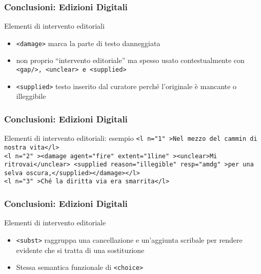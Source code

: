 \begin{frame}
    \frametitle{Conclusioni: Edizioni Digitali}
    \addtocounter{nframe}{1}
    

    \begin{block}{Elementi di intervento editoriali}
        \begin{itemize}
            \item \texttt{<damage>} marca la parte di testo danneggiata
            \item[] non proprio “intervento editoriale” ma spesso usato contestualmente con \texttt{<gap/>,  <unclear> e <supplied>}
            \item \texttt{<supplied>} testo inserito dal curatore perché l’originale è mancante o illeggibile
        \end{itemize} 
    \end{block}
\end{frame}

\begin{frame}
    \frametitle{Conclusioni: Edizioni Digitali}
    \addtocounter{nframe}{1}
    

    \begin{block}{Elementi di intervento editoriali: esempio}
        \texttt{<l n="1" >Nel mezzo del cammin di nostra vita</l>}
        \\\texttt{<l n="2" ><damage agent="fire" extent="1line" ><unclear>Mi ritrovai</unclear> <supplied reason="illegible" resp="amdg" >per una selva oscura,</supplied></damage></l>}
        \\\texttt{<l n="3" >Ché la diritta via era smarrita</l>}
    \end{block}
\end{frame}

\begin{frame}
    \frametitle{Conclusioni: Edizioni Digitali}
    \addtocounter{nframe}{1}
    

    \begin{block}{Elementi di intervento editoriale}
        \begin{itemize}
            \item \texttt{<subst>} raggruppa una cancellazione e un’aggiunta scribale per rendere evidente che si tratta di una sostituzione
            \item[] Stessa semantica funzionale di \texttt{<choice>}
        \end{itemize}
    \end{block}

\end{frame}

